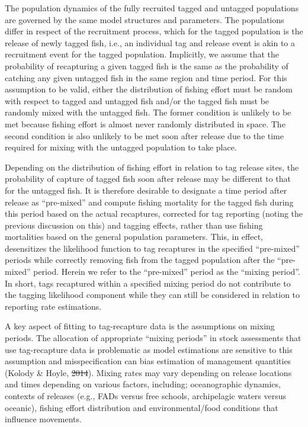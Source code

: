 \documentclass[
  english,
  a4paper,
  a4paper,
  11pt]{SCreport}
\providecommand{\DIFadd}[1]{{\protect\color{blue}\uwave{#1}}} %
\providecommand{\DIFdel}[1]{{\protect\color{red}\sout{#1}}}                      %
\providecommand{\DIFaddbegin}{} %
\providecommand{\DIFaddend}{} %
\providecommand{\DIFdelbegin}{} %
\providecommand{\DIFdelend}{} %
\newcommand{\DIFscaledelfig}{0.5}
\newlength{\DIFdelgraphicswidth} %
\newlength{\DIFdelgraphicsheight} %
\newcommand{\DIFaddincludegraphics}[2][]{{\color{blue}\fbox{\DIFOincludegraphics[#1]{#2}}}} %
\newcommand{\DIFdelincludegraphics}[2][]{%
\sbox{\DIFdelgraphicsbox}{\DIFOincludegraphics[#1]{#2}}%
\settoboxwidth{\DIFdelgraphicswidth}{\DIFdelgraphicsbox} %
\settoboxtotalheight{\DIFdelgraphicsheight}{\DIFdelgraphicsbox} %
\scalebox{\DIFscaledelfig}{%
\parbox[b]{\DIFdelgraphicswidth}{\usebox{\DIFdelgraphicsbox}\\[-\baselineskip] \rule{\DIFdelgraphicswidth}{0em}}\llap{\resizebox{\DIFdelgraphicswidth}{\DIFdelgraphicsheight}{%
\setlength{\unitlength}{\DIFdelgraphicswidth}%
\begin{picture}(1,1)%
\thicklines\linethickness{2pt} %
{\color[rgb]{1,0,0}\put(0,0){\framebox(1,1){}}}%
{\color[rgb]{1,0,0}\put(0,0){\line( 1,1){1}}}%
{\color[rgb]{1,0,0}\put(0,1){\line(1,-1){1}}}%
\end{picture}%
}\hspace*{3pt}}} %
} %
\DeclareRobustCommand{\DIFaddbegin}{\DIFOaddbegin \let\includegraphics\DIFaddincludegraphics} %
\DeclareRobustCommand{\DIFaddend}{\DIFOaddend \let\includegraphics\DIFOincludegraphics} %
\DeclareRobustCommand{\DIFdelbegin}{\DIFOdelbegin \let\includegraphics\DIFdelincludegraphics} %
\DeclareRobustCommand{\DIFdelend}{\DIFOaddend \let\includegraphics\DIFOincludegraphics} %
\begin{document}
The population dynamics of the fully recruited tagged and untagged
populations are governed by the same model structures and parameters.
The populations differ in respect of the recruitment process, which for
the tagged population is the release of newly tagged fish, i.e., an
individual tag and release event is akin to a recruitment event for the
tagged population. Implicitly, we assume that the probability of
recapturing a given tagged fish is the same as the probability of
catching any given untagged fish in the same region and time period. For
this assumption to be valid, either the distribution of fishing effort
must be random with respect to tagged and untagged fish and/or the
tagged fish must be randomly mixed with the untagged fish. The former
condition is unlikely to be met because fishing effort is almost never
randomly distributed in space. The second condition is also unlikely to
be met soon after release due to the time required for mixing with the
untagged population to take place.

Depending on the distribution of fishing effort in relation to tag
release sites, the probability of capture of tagged fish soon after
release may be different to that for the untagged fish. It is therefore
desirable to designate a time period after release as ``pre-mixed'' and
compute fishing mortality for the tagged fish during this period based
on the actual recaptures, corrected for tag reporting (noting the
previous discussion on this) and tagging effects, rather than use
fishing mortalities based on the general population parameters. This, in
effect, desensitizes the likelihood function to tag recaptures in the
specified ``pre-mixed'' periods while correctly removing fish from the
tagged population after the ``pre-mixed'' period. Herein we refer to the
``pre-mixed'' period as the ``mixing period''. In short, tags recaptured
within a specified mixing period do not contribute to the tagging
likelihood component while they can still be considered in relation to
reporting rate estimations.

A key aspect of fitting to tag-recapture data is the assumptions on
mixing periods. The allocation of appropriate ``mixing periods'' in
stock assessments that use tag-recapture data is problematic as model
estimations are sensitive to this assumption and misspecification can
bias estimation of management quantities (Kolody \& Hoyle, \DIFdelbegin \DIFdel{2014}\DIFdelend \DIFaddbegin \DIFadd{2015}\DIFaddend ). Mixing
rates may vary depending on release locations and times depending on
various factors, including; oceanographic dynamics, contexts of releases
(e.g., FADs versus free schools, archipelagic waters versus oceanic),
fishing effort distribution and environmental/food conditions that
influence movements.
\end{document}
